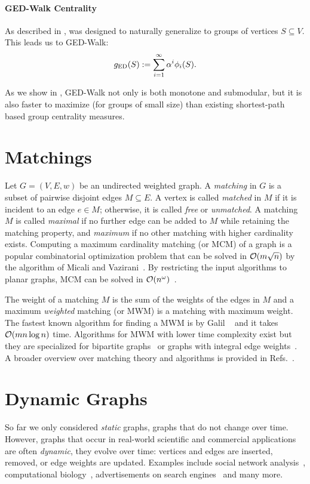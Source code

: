 \paragraph{GED-Walk Centrality}
%
As described in , \edw was designed to
naturally generalize to groups of vertices $S \subseteq V$. This leads us to
GED-Walk:
%
\[
g_{\text{ED}}(S) := \sum_{i = 1}^{\infty}\alpha^i \phi_i(S).
\]

As we show in , GED-Walk not only is both monotone and
submodular, but it is also faster to maximize (for groups of small size) than
existing shortest-path based group centrality measures.


\section{Matchings}
\label{sec:prelim:matchings}
%
Let $G = (V, E, w)$ be an undirected weighted graph. A \emph{matching} in $G$
is a subset of pairwise disjoint edges $M \subseteq E$. A vertex
is called \emph{matched} in $M$ if it is incident to an edge $e \in M$;
otherwise, it is called \emph{free} or \emph{unmatched}.
%
A matching $M$ is called \emph{maximal} if no further edge can be added to
$M$ while retaining the matching property, and \emph{maximum} if no other
matching with higher cardinality exists.
%
Computing a maximum cardinality matching (or MCM) of a graph is a popular
combinatorial optimization problem that can be solved in $\mathcal{O}(m\sqrt{n})$
by the algorithm of Micali and Vazirani~\cite{DBLP:conf/focs/MicaliV80}.
By restricting the input algorithms to planar graphs, MCM can be solved in
$\mathcal{O}(n^{\omega})$~\cite{DBLP:journals/algorithmica/MuchaS06}.

The weight of a matching $M$ is the sum of the weights of the edges in $M$
and a maximum \emph{weighted} matching (or MWM) is a matching with maximum weight.
The fastest known algorithm for finding a MWM is by Galil
\etal~\cite{galil1986efficient} and it takes $\mathcal{O}(mn\log{n})$ time. Algorithms
for MWM with lower time complexity exist
but they are specialized for bipartite graphs~\cite{DBLP:journals/tcs/Sankowski09}
or graphs with integral edge weights~\cite{DBLP:journals/jacm/GabowT91}.
%
A broader overview over matching theory and algorithms is provided in
Refs.~\parencites[Ch. 5][]{bisseling2020parallel,lovasz2009matching}.


\section{Dynamic Graphs}
\label{sec:prelim-dynamic-graphs}
So far we only considered \emph{static} graphs, \ie graphs
that do not change over time.
However, graphs that occur in real-world scientific and commercial applications
are often \emph{dynamic}, \ie they evolve over time: vertices and edges are
inserted, removed, or edge weights are updated. Examples include social network
analysis~\cite{DBLP:conf/icdm/ZhuangSTZS13}, computational
biology~\cite{DBLP:conf/compgeom/EyalH05}, advertisements on search
engines~\cite{DBLP:conf/focs/MehtaSVV05} and many more.

